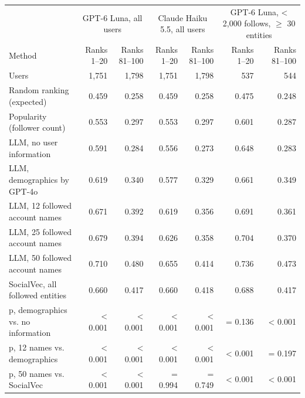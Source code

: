 \begin{tabular}{lrrrrrr}
\toprule
 & \multicolumn{2}{c}{GPT-6 Luna, all users} & \multicolumn{2}{c}{Claude Haiku 5.5, all users} & \multicolumn{2}{c}{GPT-6 Luna, \textless{} 2,000 follows, $\geq$ 30 entities} \\
Method & Ranks 1--20 & Ranks 81--100 & Ranks 1--20 & Ranks 81--100 & Ranks 1--20 & Ranks 81--100 \\
\midrule
Users & 1,751 & 1,798 & 1,751 & 1,798 & 537 & 544 \\
Random ranking (expected) & 0.459 & 0.258 & 0.459 & 0.258 & 0.475 & 0.248 \\
Popularity (follower count) & 0.553 & 0.297 & 0.553 & 0.297 & 0.601 & 0.287 \\
LLM, no user information & 0.591 & 0.284 & 0.556 & 0.273 & 0.648 & 0.283 \\
LLM, demographics by GPT-4o & 0.619 & 0.340 & 0.577 & 0.329 & 0.661 & 0.349 \\
LLM, 12 followed account names & 0.671 & 0.392 & 0.619 & 0.356 & 0.691 & 0.361 \\
LLM, 25 followed account names & 0.679 & 0.394 & 0.626 & 0.358 & 0.704 & 0.370 \\
LLM, 50 followed account names & 0.710 & 0.480 & 0.655 & 0.414 & 0.736 & 0.473 \\
SocialVec, all followed entities & 0.660 & 0.417 & 0.660 & 0.418 & 0.688 & 0.417 \\
p, demographics vs. no information & \textless{} 0.001 & \textless{} 0.001 & \textless{} 0.001 & \textless{} 0.001 & = 0.136 & \textless{} 0.001 \\
p, 12 names vs. demographics & \textless{} 0.001 & \textless{} 0.001 & \textless{} 0.001 & \textless{} 0.001 & \textless{} 0.001 & = 0.197 \\
p, 50 names vs. SocialVec & \textless{} 0.001 & \textless{} 0.001 & = 0.994 & = 0.749 & \textless{} 0.001 & \textless{} 0.001 \\
\bottomrule
\end{tabular}
